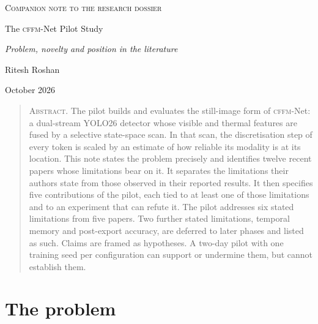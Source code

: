 \documentclass[11pt,a4paper]{article}
\newcommand{\method}{\textsc{cffm}-Net}
\begin{document}
\thispagestyle{plain}
\begin{center}
\vspace*{6mm}
{\small\scshape\color{muted} Companion note to the research dossier\par}
\vspace{7mm}
{\fontsize{21}{27}\selectfont The \method{} Pilot Study\par}
\vspace{3mm}
{\large\itshape Problem, novelty and position in the literature\par}
\vspace{7mm}
{\normalsize Ritesh Roshan\par}
\vspace{1mm}
{\small\color{muted} October 2026\par}
\vspace{6mm}
\end{center}

\begin{quote}
\small
\textsc{Abstract.} The pilot builds and evaluates the still-image form of \method{}:
a dual-stream YOLO26 detector whose visible and thermal features are fused by a
selective state-space scan. In that scan, the discretisation step of every token is
scaled by an estimate of how reliable its modality is at its location. This note
states the problem precisely and identifies twelve recent papers whose limitations
bear on it. It separates the limitations their authors state from those observed in
their reported results. It then specifies five contributions of the pilot, each tied
to at least one of those limitations and to an experiment that can refute it. The
pilot addresses six stated limitations from five papers. Two further stated
limitations, temporal memory and post-export accuracy, are deferred to later phases
and listed as such. Claims are framed as hypotheses. A two-day pilot with one
training seed per configuration can support or undermine them, but cannot establish
them.
\end{quote}

\section{The problem}
\end{document}
